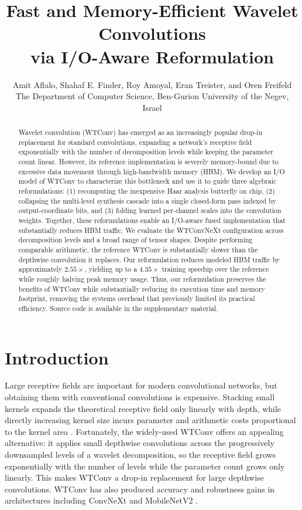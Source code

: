 \documentclass[10pt]{article} %
\title{Fast and Memory-Efficient Wavelet Convolutions\\ via I/O-Aware Reformulation}
\author{\name Amit Aflalo, \name Shahaf E. Finder, \name Roy Amoyal, \name Eran Treister, and \name Oren Freifeld\\
        \addr The Department of Computer Science, Ben-Gurion University of the Negev, Israel}
\theoremstyle{plain}
\begin{document}
\maketitle

\begin{abstract}
Wavelet convolution (WTConv) has emerged as an increasingly popular drop-in replacement for standard convolutions, expanding a network's receptive field exponentially with the number of decomposition levels while keeping the parameter count linear. However, its reference implementation is severely memory-bound due to excessive data movement through high-bandwidth memory (HBM). We develop an I/O model of WTConv to characterize this bottleneck and use it to guide three algebraic reformulations: (1) recomputing the inexpensive Haar analysis butterfly on chip, (2) collapsing the multi-level synthesis cascade into a single closed-form pass indexed by output-coordinate bits, and (3) folding learned per-channel scales into the convolution weights. Together, these reformulations enable an I/O-aware fused implementation that substantially reduces HBM traffic. We evaluate the WTConvNeXt configuration across decomposition levels and a broad range of tensor shapes. Despite performing comparable arithmetic, the reference WTConv is substantially slower than the depthwise convolution it replaces. Our reformulation reduces modeled HBM traffic by approximately $2.55\times$, yielding up to a $4.35\times$ training speedup over the reference while roughly halving peak memory usage. Thus, our reformulation preserves the benefits of WTConv while substantially reducing its execution time and memory footprint, removing the systems overhead that previously limited its practical efficiency. Source code is available in the supplementary material.



\end{abstract}

\section{Introduction}

Large receptive fields are important for modern convolutional networks, but obtaining them with conventional convolutions is expensive. Stacking small kernels expands the theoretical receptive field only linearly with depth, while directly increasing kernel size incurs parameter and arithmetic costs proportional to the kernel area \citep{luo2016erf,ding2022replknet,liu2023slak}. 
Fortunately, the widely-used WTConv \citep{finder2024wavelet} offers an appealing alternative: it applies small depthwise convolutions across the progressively downsampled levels of a wavelet decomposition, so the receptive field grows exponentially with the number of levels while the parameter count grows only linearly. This makes WTConv a drop-in replacement for large depthwise convolutions. WTConv has also produced accuracy and robustness gains in architectures including ConvNeXt and MobileNetV2 \citep{liu2022convnext,sandler2018mobilenetv2}.
\end{document}
